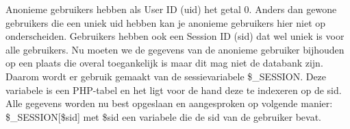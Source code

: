 Anonieme gebruikers hebben als User ID (uid) het getal 0. Anders dan gewone gebruikers die een uniek uid hebben kan je anonieme gebruikers hier niet op onderscheiden. Gebruikers hebben ook een Session ID (sid) dat wel uniek is voor alle gebruikers. Nu moeten we de gegevens van de anonieme gebruiker bijhouden op een plaats die overal toegankelijk is maar dit mag niet de databank zijn. Daarom wordt er gebruik gemaakt van de sessievariabele \cite{sessionVariable} \$\_SESSION. Deze variabele is een PHP-tabel en het ligt voor de hand deze te indexeren op de sid. Alle gegevens worden nu best opgeslaan en aangesproken op volgende manier: \$\_SESSION[\$sid] met \$sid een variabele die de sid van de gebruiker bevat. 